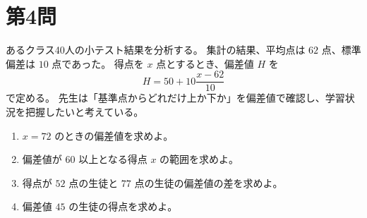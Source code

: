 \documentclass[a4paper,12pt]{jsarticle}
\begin{document}
\section*{第4問}
あるクラス40人の小テスト結果を分析する。  
集計の結果、平均点は $62$ 点、標準偏差は $10$ 点であった。  
得点を $x$ 点とするとき、偏差値 $H$ を
\[
H=50+10\frac{x-62}{10}
\]
で定める。  
先生は「基準点からどれだけ上か下か」を偏差値で確認し、学習状況を把握したいと考えている。

\begin{enumerate}[label=\arabic*.]
  \item $x=72$ のときの偏差値を求めよ。
  \item 偏差値が $60$ 以上となる得点 $x$ の範囲を求めよ。
  \item 得点が $52$ 点の生徒と $77$ 点の生徒の偏差値の差を求めよ。
  \item 偏差値 $45$ の生徒の得点を求めよ。
\end{enumerate}
\end{document}
